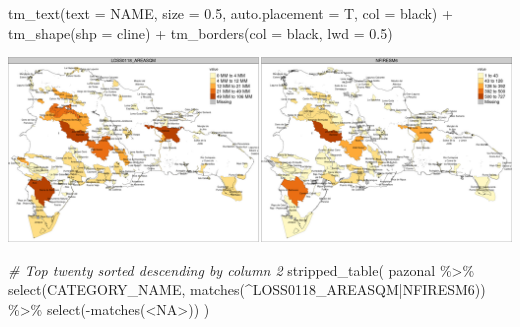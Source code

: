 \documentclass[10pt,landscape,a3paper]{article}
\newenvironment{Shaded}{\begin{snugshade}}{\end{snugshade}}
\newcommand{\AttributeTok}[1]{\textcolor[rgb]{0.77,0.63,0.00}{#1}}
\newcommand{\CommentTok}[1]{\textcolor[rgb]{0.56,0.35,0.01}{\textit{#1}}}
\newcommand{\FloatTok}[1]{\textcolor[rgb]{0.00,0.00,0.81}{#1}}
\newcommand{\FunctionTok}[1]{\textcolor[rgb]{0.00,0.00,0.00}{#1}}
\newcommand{\NormalTok}[1]{#1}
\newcommand{\SpecialCharTok}[1]{\textcolor[rgb]{0.00,0.00,0.00}{#1}}
\newcommand{\StringTok}[1]{\textcolor[rgb]{0.31,0.60,0.02}{#1}}
\begin{document}
\begin{Shaded}
\begin{Highlighting}[]
  \FunctionTok{tm\_text}\NormalTok{(}\AttributeTok{text =} \StringTok{\textquotesingle{}NAME\textquotesingle{}}\NormalTok{, }\AttributeTok{size =} \FloatTok{0.5}\NormalTok{, }\AttributeTok{auto.placement =}\NormalTok{ T, }\AttributeTok{col =} \StringTok{\textquotesingle{}black\textquotesingle{}}\NormalTok{) }\SpecialCharTok{+} 
  \FunctionTok{tm\_shape}\NormalTok{(}\AttributeTok{shp =}\NormalTok{ cline) }\SpecialCharTok{+} \FunctionTok{tm\_borders}\NormalTok{(}\AttributeTok{col =} \StringTok{\textquotesingle{}black\textquotesingle{}}\NormalTok{, }\AttributeTok{lwd =} \FloatTok{0.5}\NormalTok{)}
\end{Highlighting}
\end{Shaded}

\begin{center}\includegraphics{img/zonal-pa-9} \end{center}

\begin{Shaded}
\begin{Highlighting}[]
\CommentTok{\# Top twenty sorted descending by column 2}
\FunctionTok{stripped\_table}\NormalTok{(}
\NormalTok{  pazonal }\SpecialCharTok{\%\textgreater{}\%} \FunctionTok{select}\NormalTok{(CATEGORY\_NAME, }\FunctionTok{matches}\NormalTok{(}\StringTok{\textquotesingle{}\^{}LOSS0118\_AREASQM|NFIRESM6\textquotesingle{}}\NormalTok{)) }\SpecialCharTok{\%\textgreater{}\%}
    \FunctionTok{select}\NormalTok{(}\SpecialCharTok{{-}}\FunctionTok{matches}\NormalTok{(}\StringTok{\textquotesingle{}\textless{}NA\textgreater{}\textquotesingle{}}\NormalTok{))}
\NormalTok{)}
\end{Highlighting}
\end{Shaded}
\end{document}
